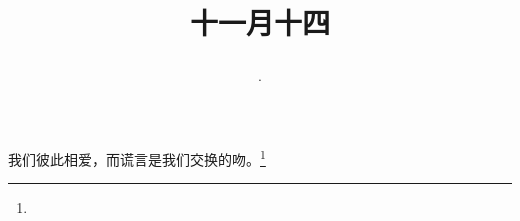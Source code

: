 \title{\date[d=14,m=12,y=2024][year:cn-y,年,month:cn,day:cn,日,·,weekday]·十一月十四 }
我们彼此相爱，而谎言是我们交换的吻。\footnote{ }


